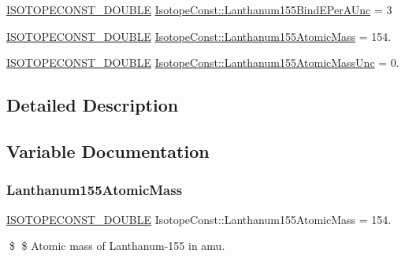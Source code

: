 \begin{DoxyCompactItemize}
\mbox{\hyperlink{group___isotope_const-_macros_ga8f45a7272ce02c0b4c65c44636ed719a}{I\+S\+O\+T\+O\+P\+E\+C\+O\+N\+S\+T\+\_\+\+D\+O\+U\+B\+LE}} \mbox{\hyperlink{group___isotope_const-_lanthanum-_la155_ga9c87ac132abc802a6c3a3f31b81b6cc0}{Isotope\+Const\+::\+Lanthanum155\+Bind\+E\+Per\+A\+Unc}} = 3
\item 
\mbox{\hyperlink{group___isotope_const-_macros_ga8f45a7272ce02c0b4c65c44636ed719a}{I\+S\+O\+T\+O\+P\+E\+C\+O\+N\+S\+T\+\_\+\+D\+O\+U\+B\+LE}} \mbox{\hyperlink{group___isotope_const-_lanthanum-_la155_ga5df3569575be510694aa14f3591f77de}{Isotope\+Const\+::\+Lanthanum155\+Atomic\+Mass}} = 154.
\item 
\mbox{\hyperlink{group___isotope_const-_macros_ga8f45a7272ce02c0b4c65c44636ed719a}{I\+S\+O\+T\+O\+P\+E\+C\+O\+N\+S\+T\+\_\+\+D\+O\+U\+B\+LE}} \mbox{\hyperlink{group___isotope_const-_lanthanum-_la155_gabe4f60a0f9a52aae6d46b32547cc2c57}{Isotope\+Const\+::\+Lanthanum155\+Atomic\+Mass\+Unc}} = 0.
\end{DoxyCompactItemize}


\subsection{Detailed Description}


\subsection{Variable Documentation}
\mbox{\label{group___isotope_const-_lanthanum-_la155_ga5df3569575be510694aa14f3591f77de}} 
\subsubsection{\texorpdfstring{Lanthanum155\+Atomic\+Mass}{Lanthanum155AtomicMass}}
{\footnotesize\ttfamily \mbox{\hyperlink{group___isotope_const-_macros_ga8f45a7272ce02c0b4c65c44636ed719a}{I\+S\+O\+T\+O\+P\+E\+C\+O\+N\+S\+T\+\_\+\+D\+O\+U\+B\+LE}} Isotope\+Const\+::\+Lanthanum155\+Atomic\+Mass = 154.}

\$ \$ Atomic mass of Lanthanum-\/155 in amu. \mbox{\label{group___isotope_const-_lanthanum-_la155_gabe4f60a0f9a52aae6d46b32547cc2c57}} 
